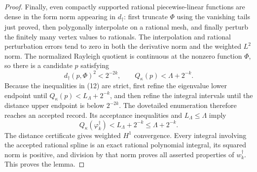\documentclass{article}
\begin{document}
{\begin{proof}
Finally, even compactly supported rational piecewise-linear functions are dense in the form norm appearing in \(d_\dagger\): first truncate \(\Phi\) using the vanishing tails just proved, then polygonally interpolate on a rational mesh, and finally perturb the finitely many vertex values to rationals.  The interpolation and rational perturbation errors tend to zero in both the derivative norm and the weighted \(L^2\) norm.  The normalized Rayleigh quotient is continuous at the nonzero function \(\Phi\), so there is a candidate \(p\) satisfying
\[
d_\dagger(p,\Phi)^2<2^{-2k},
\qquad Q_\kappa(p)<\Lambda+2^{-k}. \tag{12}
\]
Because the inequalities in (12) are strict, first refine the eigenvalue lower endpoint until \(Q_\kappa(p)<L_\Lambda+2^{-k}\), and then refine the integral intervals until the distance upper endpoint is below \(2^{-2k}\).  The dovetailed enumeration therefore reaches an accepted record.  Its acceptance inequalities and \(L_\Lambda\le\Lambda\) imply
\[
Q_\kappa(\varphi_k^\dagger)
<L_\Lambda+2^{-k}\le\Lambda+2^{-k}. \tag{13}
\]
The distance certificate gives weighted \(H^1\) convergence.  Every integral involving the accepted rational spline is an exact rational polynomial integral, its squared norm is positive, and division by that norm proves all asserted properties of \(w_k^\dagger\).  This proves the lemma.
\end{proof}

}
\end{document}
